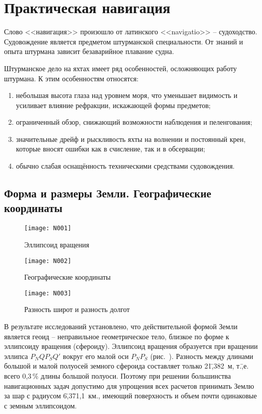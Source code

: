 \chapter{Практическая навигация}

Слово <<навигация>> произошло от латинского <<navigatio>> \--- судоходство. Судовождение является предметом штурманской специальности. От знаний и опыта штурмана зависит безаварийное плавание судна.

Штурманское дело на яхтах имеет ряд особенностей, осложняющих работу штурмана. К этим особенностям относятся: 
\begin{enumerate}
\item небольшая высота глаза над уровнем моря, что уменьшает видимость и усиливает влияние рефракции, искажающей формы предметов; 
\item ограниченный обзор, снижающий возможности наблюдения и пеленгования; 
\item значительные дрейф и рыскливость яхты на волнении и постоянный крен, которые вносят ошибки как в счисление, так и в обсервации; 
\item обычно слабая оснащённость техническими средствами судовождения. 
\end{enumerate}

\section{Форма и размеры Земли. Географические координаты} 

\begin{figure}[htb]
  \centering{}
  \texttt{[image: N001]}
  \caption{Эллипсоид вращения}
  \label{fig:N1}
\end{figure}

\begin{figure}[htb]
  \centering{}
  \texttt{[image: N002]}
  \caption{Географические координаты}
  \label{fig:N2}
\end{figure}

\begin{figure*}[htb]
  \centering{}
  \texttt{[image: N003]}
  \caption{Разность широт и разность долгот}
  \label{fig:N3}
\end{figure*}

В результате исследований установлено, что действительной формой Земли является геоид \--- неправильное геометрическое тело, близкое по форме к эллипсоиду вращения (сфероиду). Эллипсоид вращения образуется при вращении эллипса $P_NQP_SQ'$ вокруг его малой оси $P_NP_S$ (рис.~). Разность между длинами большой и малой полуосей земного сфероида составляет только 21\=,382~м, т.\=,е. всего 0,3\,\% длины большой полуоси. Поэтому при решении большинства навигационных задач допустимо для упрощения всех расчетов принимать Землю за шар с радиусом 6\=,371,1~км., имеющий поверхность и объем почти одинаковые с земным эллипсоидом. 

